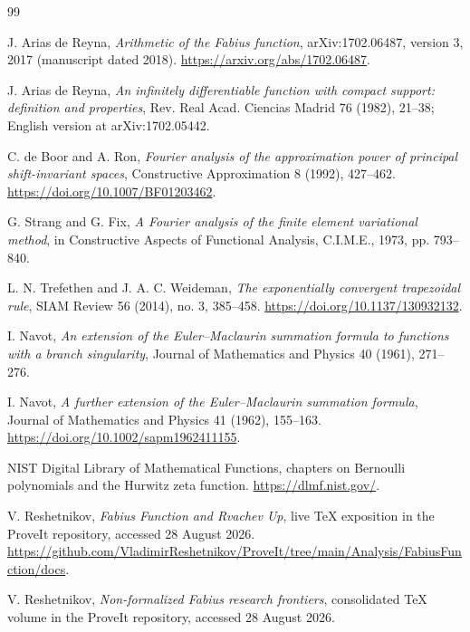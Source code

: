 \documentclass[11pt]{article}
\theoremstyle{definition}
\begin{document}
\begin{thebibliography}{99}

J. Arias de Reyna,
\emph{Arithmetic of the Fabius function},
arXiv:1702.06487, version 3, 2017 (manuscript dated 2018).
\url{https://arxiv.org/abs/1702.06487}.

J. Arias de Reyna,
\emph{An infinitely differentiable function with compact support: definition
and properties},
Rev. Real Acad. Ciencias Madrid 76 (1982), 21--38;
English version at arXiv:1702.05442.

C. de Boor and A. Ron,
\emph{Fourier analysis of the approximation power of principal
shift-invariant spaces},
Constructive Approximation 8 (1992), 427--462.
\url{https://doi.org/10.1007/BF01203462}.

G. Strang and G. Fix,
\emph{A Fourier analysis of the finite element variational method},
in Constructive Aspects of Functional Analysis, C.I.M.E., 1973,
pp. 793--840.

L. N. Trefethen and J. A. C. Weideman,
\emph{The exponentially convergent trapezoidal rule},
SIAM Review 56 (2014), no. 3, 385--458.
\url{https://doi.org/10.1137/130932132}.

I. Navot,
\emph{An extension of the Euler--Maclaurin summation formula to functions
with a branch singularity},
Journal of Mathematics and Physics 40 (1961), 271--276.

I. Navot,
\emph{A further extension of the Euler--Maclaurin summation formula},
Journal of Mathematics and Physics 41 (1962), 155--163.
\url{https://doi.org/10.1002/sapm1962411155}.

NIST Digital Library of Mathematical Functions,
chapters on Bernoulli polynomials and the Hurwitz zeta function.
\url{https://dlmf.nist.gov/}.

V. Reshetnikov,
\emph{Fabius Function and Rvachev Up}, live TeX exposition in the ProveIt
repository, accessed 28 August 2026.
\url{https://github.com/VladimirReshetnikov/ProveIt/tree/main/Analysis/FabiusFunction/docs}.

V. Reshetnikov,
\emph{Non-formalized Fabius research frontiers}, consolidated TeX volume in
the ProveIt repository, accessed 28 August 2026.

\end{thebibliography}
\end{document}
